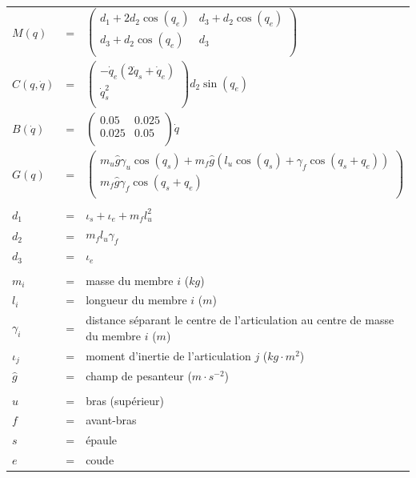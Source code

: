 \documentclass[pdftex,a4paper,11pt]{article}
\numberwithin{equation}{subsection}
\begin{document}
\paragraph{}
\begin{tabular}{lcl}
    $M(q)$ & = &
    $
    \begin{pmatrix}
        d_1 + 2 d_2 \cos(q_e)  & d_3 + d_2 \cos(q_e) \\
        d_3 + d_2 \cos(q_e) & d_3 \\
    \end{pmatrix}
    $ \\

    $C(q, \dot{q})$ & = &
    $
    \begin{pmatrix}
        -\dot{q}_e (2 \dot{q}_s + \dot{q}_e) \\
        \dot{q}_s^2 \\
    \end{pmatrix}
    d_2 \sin(q_e)
    $\\

    $B(\dot{q})$ & = &
    $
    \begin{pmatrix}
        0.05  & 0.025 \\
        0.025 & 0.05 \\
    \end{pmatrix}
    \dot{q}
    $\\

    $G(q)$ & = &
    $
    \begin{pmatrix}
        m_u \hat{g}  \gamma_u \cos(q_s) + m_f \hat{g} (l_u \cos(q_s) + \gamma_f \cos(q_s + q_e)) \\
        m_f \hat{g}  \gamma_f \cos(q_s + q_e) \\
    \end{pmatrix}
    $ \\

    \\
    $d_1$ & = & $\iota_s + \iota_e + m_f l_u^2$ \\
    $d_2$ & = & $m_f l_u \gamma_f$ \\
    $d_3$ & = & $\iota_e$ \\
    \\
    $m_i$ & = & masse du membre $i$ ($kg$) \\
    $l_i$ & = & longueur du membre $i$ ($m$) \\
    $\gamma_i$ & = & distance séparant le centre de l'articulation au centre de masse du membre $i$ ($m$) \\
    $\iota_j$ & = & moment d'inertie de l'articulation $j$ ($kg \cdot m^2$) \\
    $\hat{g}$ & = & champ de pesanteur ($m \cdot s^{-2}$) \\
    \\

    $u$ & = & bras (supérieur)\\
    $f$ & = & avant-bras\\

    $s$ & = & épaule\\
    $e$ & = & coude\\
\end{tabular}
\end{document}
